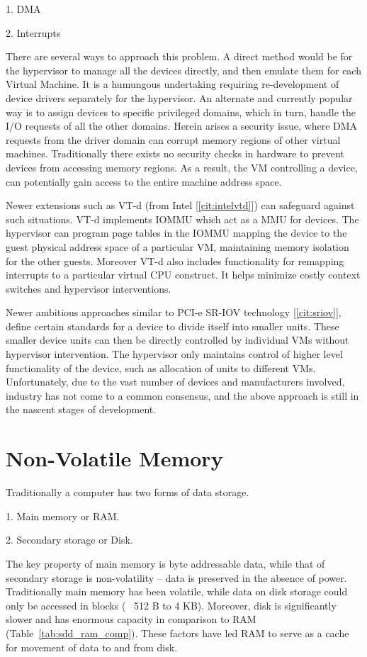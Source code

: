 1. DMA

2. Interrupts

There are several ways to approach this problem. A direct method would be for the hypervisor to manage all the devices directly, and then emulate them for each Virtual Machine. It is a humungous undertaking requiring re-development of device drivers separately for the hypervisor. An alternate and currently popular way is to assign devices to specific privileged domains, which in turn, handle the I/O requests of all the other domains. Herein arises a security issue, where DMA requests from the driver domain can corrupt memory regions of other virtual machines. Traditionally there exists no security checks in hardware to prevent devices from accessing memory regions. As a result, the VM controlling a device, can potentially gain access to the entire machine address space.

Newer extensions such as VT-d (from Intel [\ref{cit:intelvtd}]) can safeguard against such situations. VT-d implements IOMMU which act as a MMU for devices. The hypervisor can program page tables in the IOMMU mapping the device to the guest physical address space of a particular VM, maintaining memory isolation for the other guests. Moreover VT-d also includes functionality for remapping interrupts to a particular virtual CPU construct. It helps minimize costly context switches and hypervisor interventions.

Newer ambitious approaches similar to PCI-e SR-IOV technology [\ref{cit:sriov}], define certain standards for a device to divide itself into smaller units. These smaller device units can then be directly controlled by individual VMs without hypervisor intervention. The hypervisor only maintains control of higher level functionality of the device, such as allocation of units to different VMs. Unfortunately, due to the vast number of devices and manufacturers involved, industry has not come to a common consensus, and the above approach is still in the nascent stages of development. 

\section{Non-Volatile Memory}
Traditionally a computer has two forms of data storage.

1. Main memory or RAM.

2. Secondary storage or Disk.

The key property of main memory is byte addressable data, while that of secondary storage is non-volatility -- data is preserved in the absence of power. Traditionally main memory has been volatile, while data on disk storage could only be accessed in blocks (~ 512 B to 4 KB). Moreover, disk is significantly slower and has enormous capacity in comparison to RAM (Table~\ref{tab:sdd_ram_comp}). These factors have led RAM to serve as a cache for movement of data to and from disk.

